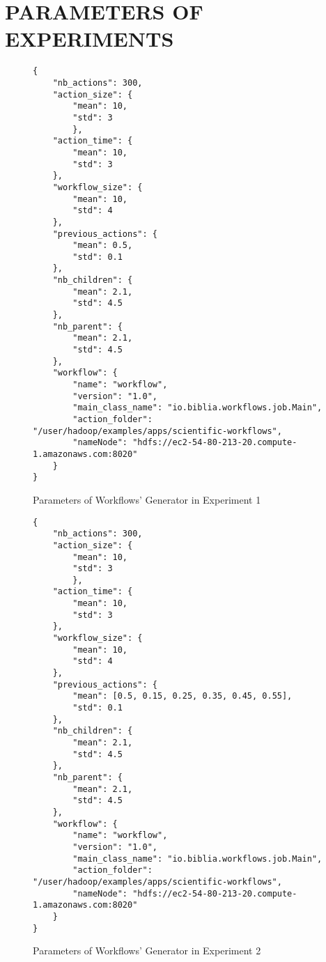 \chapter{PARAMETERS OF EXPERIMENTS}
\label{app:experiment_1_parameters}
\begin{figure}
\begin{singlespace}
\begin{mdframed}
\begin{verbatim}
{
	"nb_actions": 300,
	"action_size": {
		"mean": 10,
		"std": 3
		},
	"action_time": {
		"mean": 10, 
		"std": 3
	},
	"workflow_size": {
		"mean": 10,
		"std": 4
	},
	"previous_actions": {
		"mean": 0.5,
		"std": 0.1
	},
	"nb_children": {
		"mean": 2.1,
		"std": 4.5
	},
	"nb_parent": {
		"mean": 2.1,
		"std": 4.5
	},
	"workflow": {
		"name": "workflow",
		"version": "1.0",
		"main_class_name": "io.biblia.workflows.job.Main",
		"action_folder": "/user/hadoop/examples/apps/scientific-workflows",
		"nameNode": "hdfs://ec2-54-80-213-20.compute-1.amazonaws.com:8020"
	}
}
\end{verbatim}
\end{mdframed}

\caption{Parameters of Workflows' Generator in Experiment 1}
\label{fig:parameters_generator_experiment_1}
\end{singlespace}
\end{figure} 


\label{app:experiment_2_parameters}
\begin{figure}
\begin{singlespace}
\begin{mdframed}
\begin{verbatim}
{
	"nb_actions": 300,
	"action_size": {
		"mean": 10,
		"std": 3
		},
	"action_time": {
		"mean": 10, 
		"std": 3
	},
	"workflow_size": {
		"mean": 10,
		"std": 4
	},
	"previous_actions": {
		"mean": [0.5, 0.15, 0.25, 0.35, 0.45, 0.55],
		"std": 0.1
	},
	"nb_children": {
		"mean": 2.1,
		"std": 4.5
	},
	"nb_parent": {
		"mean": 2.1,
		"std": 4.5
	},
	"workflow": {
		"name": "workflow",
		"version": "1.0",
		"main_class_name": "io.biblia.workflows.job.Main",
		"action_folder": "/user/hadoop/examples/apps/scientific-workflows",
		"nameNode": "hdfs://ec2-54-80-213-20.compute-1.amazonaws.com:8020"
	}
}
\end{verbatim}
\end{mdframed}

\caption{Parameters of Workflows' Generator in Experiment 2}
\label{fig:parameters_generator_experiment_2}
\end{singlespace}
\end{figure} 
